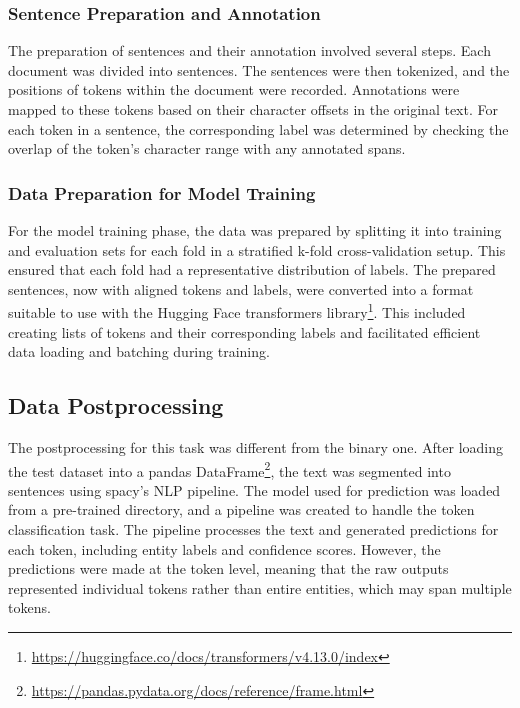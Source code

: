 \documentclass{Configuration_Files/PoliMi3i_thesis}
\begin{document}
\subsubsection{Sentence Preparation and Annotation} \label{subsec:sentence_preparation_T2}
The preparation of sentences and their annotation involved several steps. Each document was divided into sentences. The sentences were then tokenized, and the positions of tokens within the document were recorded. Annotations were mapped to these tokens based on their character offsets in the original text. For each token in a sentence, the corresponding label was determined by checking the overlap of the token’s character range with any annotated spans.

\subsubsection{Data Preparation for Model Training} \label{subsec:data_prepatation_model_training_T2}
For the model training phase, the data was prepared by splitting it into training and evaluation sets for each fold in a stratified k-fold cross-validation setup. This ensured that each fold had a representative distribution of labels. The prepared sentences, now with aligned tokens and labels, were converted into a format suitable to use with the Hugging Face transformers library\footnote{\url{https://huggingface.co/docs/transformers/v4.13.0/index}}. This included creating lists of tokens and their corresponding labels and facilitated efficient data loading and batching during training.

\subsection{Data Postprocessing}\label{subsec:data_postprocessing_T2}
The postprocessing for this task was different from the binary one. After loading the test dataset into a pandas DataFrame\footnote{\url{https://pandas.pydata.org/docs/reference/frame.html}}, the text was segmented into sentences using spacy’s NLP pipeline. The model used for prediction was loaded from a pre-trained directory, and a pipeline was created to handle the token classification task. The pipeline processes the text and generated predictions for each token, including entity labels and confidence scores. However, the predictions were made at the token level, meaning that the raw outputs represented individual tokens rather than entire entities, which may span multiple tokens.
\end{document}
